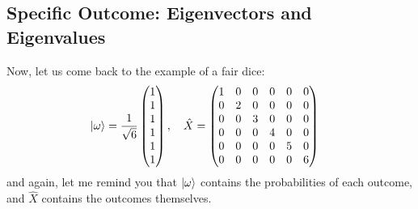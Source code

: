 \subsection{Specific Outcome: Eigenvectors and Eigenvalues}
Now, let us come back to the example of a fair dice:
\begin{align}
  \lvert\omega\rangle & = \frac{1}{\sqrt{6}} \begin{pmatrix}
                                        1 \\
                                        1 \\
                                        1 \\
                                        1 \\
                                        1 \\
                                        1
                                      \end{pmatrix}, \quad
  \hat{X}   = \begin{pmatrix}
                1 & 0 & 0 & 0 & 0 & 0 \\
                0 & 2 & 0 & 0 & 0 & 0 \\
                0 & 0 & 3 & 0 & 0 & 0 \\
                0 & 0 & 0 & 4 & 0 & 0 \\
                0 & 0 & 0 & 0 & 5 & 0 \\
                0 & 0 & 0 & 0 & 0 & 6
              \end{pmatrix}
\end{align}
and again, let me remind you that $\lvert\omega\rangle$ contains the probabilities of each outcome, and $\hat{X}$ contains the outcomes themselves.

